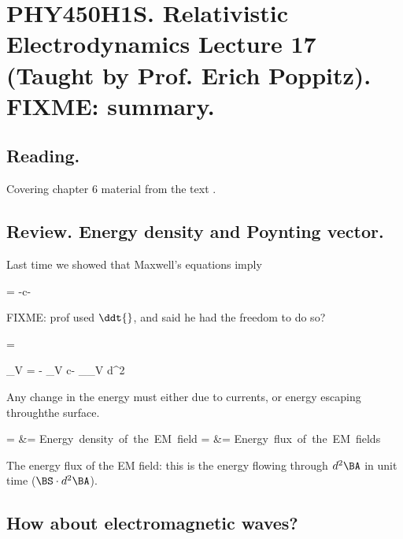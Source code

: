 
%

\chapter{PHY450H1S.  Relativistic Electrodynamics Lecture 17 (Taught by Prof. Erich Poppitz).  FIXME: summary.}
\label{chap:relativisticElectrodynamicsL17}
{}
\date{Mar 8, 2011}

\beginArtNoToc

\section{Reading.}

Covering chapter 6 material from the text \cite{landau1980classical}.


\section{Review.  Energy density and Poynting vector.}

Last time we showed that Maxwell's equations imply

  = -\Bj c\dot \BE - \spacegrad \cdot \BS

FIXME: prof used $\ddt{}$, and said he had the freedom to do so?

\BS =  \BE \cross \BB

 \int_V  = - \int_V \Bj c\dot \BE - \int_{\partial_V} d^2 \sigma \cdot \BS

Any change in the energy must either due to currents, or energy escaping throughthe surface.

 =  &= \mbox{Energy density of the EM field}
\BS =  \BE \cross \BB &= \mbox{Energy flux of the EM fields}

The energy flux of the EM field: this is the energy flowing through $d^2 \BA$ in unit time ($\BS \cdot d^2 \BA$).

\section{How about electromagnetic waves?}

